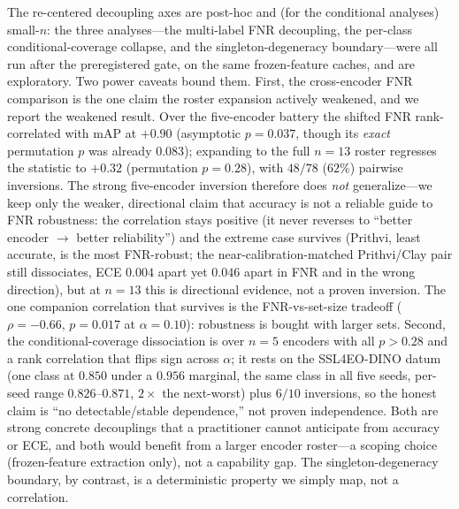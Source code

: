 \documentclass[journal]{IEEEtran}
\renewcommand{\_}{\textunderscore\allowbreak}
\begin{document}
The re-centered decoupling axes are post-hoc and (for the conditional analyses) small-$n$: the three
analyses---the multi-label FNR decoupling, the per-class conditional-coverage collapse, and the
singleton-degeneracy boundary---were all run after the preregistered gate, on the same frozen-feature
caches, and are exploratory. Two power caveats bound them. First, the cross-encoder FNR
comparison is the one claim the roster expansion actively weakened, and we report the weakened result. Over
the five-encoder battery the shifted FNR rank-correlated with mAP at $+0.90$ (asymptotic $p{=}0.037$,
though its \emph{exact} permutation $p$ was already $0.083$); expanding to the full $n{=}13$ roster
regresses the statistic to $+0.32$ (permutation $p{=}0.28$), with $48/78$ ($62\%$) pairwise inversions.
The strong five-encoder inversion therefore does \emph{not} generalize---we keep only the weaker,
directional claim that accuracy is not a reliable guide to FNR robustness: the correlation stays
positive (it never reverses to ``better encoder $\to$ better reliability'') and the extreme case survives
(Prithvi, least accurate, is the most FNR-robust; the near-calibration-matched Prithvi/Clay pair still
dissociates, ECE $0.004$ apart yet $0.046$ apart in FNR and in the wrong direction), but at $n{=}13$ this is
directional evidence, not a proven inversion. The one companion correlation that survives is the
FNR-vs-set-size tradeoff ($\rho{=}-0.66$, $p{=}0.017$ at $\alpha{=}0.10$): robustness is bought with
larger sets. Second, the conditional-coverage dissociation is over
$n{=}5$ encoders with all $p>0.28$ and a rank correlation that flips sign across $\alpha$; it rests on the
SSL4EO-DINO datum (one class at $0.850$ under a $0.956$ marginal, the same class in all five seeds,
per-seed range $0.826$--$0.871$, $2\times$ the next-worst) plus $6/10$
inversions, so the honest claim is ``no detectable/stable dependence,'' not proven independence. Both are
strong concrete decouplings that a practitioner cannot anticipate from accuracy or ECE, and both
would benefit from a larger encoder roster---a scoping choice (frozen-feature extraction only), not a
capability gap. The singleton-degeneracy boundary, by contrast, is a deterministic property we simply
map, not a correlation.
\end{document}
